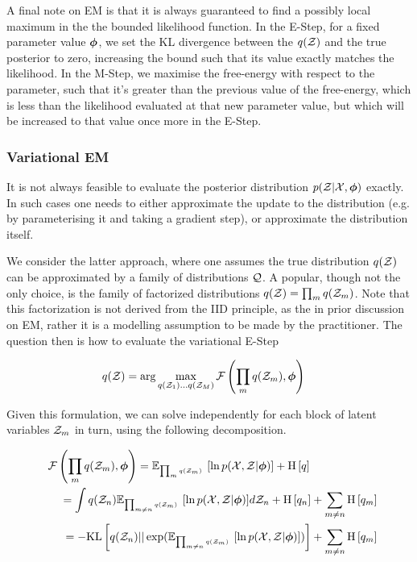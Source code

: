 A final note on EM is that it is always guaranteed to find a possibly local maximum in the the bounded likelihood function. In the E-Step, for a fixed parameter value ${ \bm \phi }$, we set the KL divergence between the $q({ \mathcal{Z} })$ and the true posterior to zero, increasing the bound such that its value exactly matches the likelihood. In the M-Step, we maximise the free-energy with respect to the parameter, such that it's greater than the previous value of the free-energy, which is less than the likelihood evaluated at that new parameter value, but which will be increased to that value once more in the E-Step.


\subsubsection{Variational EM}
It is not always feasible to evaluate the posterior distribution $p({ \mathcal{Z} }|{ \mathcal{X} }, { \bm \phi })$ exactly. In such cases one needs to either approximate the update to the distribution (e.g. by parameterising it and taking a gradient step), or approximate the distribution itself.

We consider the latter approach, where one assumes the true distribution $q({ \mathcal{Z} })$ can be approximated by a family of distributions ${ \mathcal{Q} }$. A popular, though not the only choice, is the family of factorized distributions $q({ \mathcal{Z} }) = \prod_m q({ \mathcal{Z} }_m)$. Note that this factorization is not derived from the IID principle, as the in prior discussion on EM, rather it is a modelling assumption to be made by the practitioner. The question then is how to evaluate the variational E-Step

\begin{align*}
q({ \mathcal{Z} }) & = \arg \max_{q({ \mathcal{Z} }_1) \ldots q({ \mathcal{Z} }_M)} { \mathcal{F}\left( {\prod_m q({ \mathcal{Z} }_m), { \bm \phi }} \right) }
\end{align*}

Given this formulation, we can solve independently for each block of latent variables ${ \mathcal{Z} }_m$ in turn, using the following decomposition.

\begin{align*}
{ \mathcal{F}\left( {\prod_m q( { \mathcal{Z} } _m),  {  \bm \phi  } } \right) } 
 = { \mathbb{E}_{ { {{ \mbox{\tiny ${\prod_m q({ \mathcal{Z} }_m)}$ } }} } }\left[ { \ln { p( { \mathcal{X} } ,  { \mathcal{Z} } |  {  \bm \phi  } ) } } \right] } + \text{H} \left[ q \right] \qquad\qquad\qquad\\
\qquad = \int q({ \mathcal{Z} }_n) { \mathbb{E}_{ { {{ \mbox{\tiny ${\prod_{m\neq n} q({ \mathcal{Z} }_m)}$ } }} } }\left[ { \ln { p( { \mathcal{X} } ,  { \mathcal{Z} } |  {  \bm \phi  } ) } } \right] } d{ \mathcal{Z} }_n + \text{H} \left[ q_n \right] + \sum_{m\neq n} \text{H} \left[ q_m \right] \\
\qquad = -\text{KL}\left[q({ \mathcal{Z} }_n)||\exp({ \mathbb{E}_{ { {{ \mbox{\tiny ${\prod_{m\neq n} q({ \mathcal{Z} }_m)}$ } }} } }\left[ { \ln { p( { \mathcal{X} } ,  { \mathcal{Z} } |  {  \bm \phi  } ) } } \right] })\right] + \sum_{m\neq n} \text{H} \left[ q_m \right]
\end{align*}

